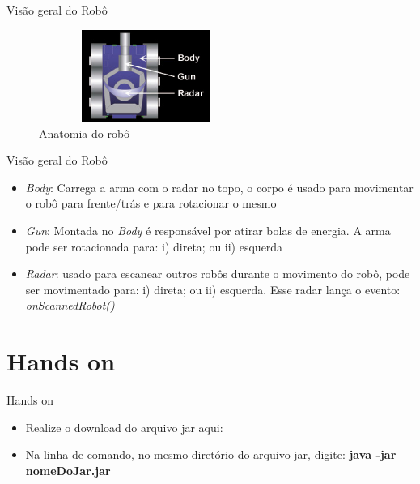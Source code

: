 \begin{frame}
	\begin{block}{Visão geral do Robô}
		\begin{figure}[!htb]
			\centering	  				
			\includegraphics[height=3cm, width = 7cm]{./pic/Anatomy.jpg}
			\caption{Anatomia do robô  \citep{ROBOWIKI}}
			\label{fig_instalacao04}
		\end{figure}
	\end{block}
\end{frame}


\begin{frame}
	\begin{block}{Visão geral do Robô}
		\begin{itemize}
			\item \emph{Body}: Carrega a arma com o radar no topo, o corpo é usado para movimentar o robô para frente/trás e para rotacionar o mesmo
			
			\item \emph{Gun}: Montada no \emph{Body} é responsável por atirar bolas de energia. A arma pode ser rotacionada para: i) direta; ou ii) esquerda

			\item \emph{Radar}: usado para escanear outros robôs durante o movimento do robô, pode ser movimentado para: i) direta; ou ii) esquerda. Esse radar lança o evento:  \emph{onScannedRobot()}  \citep{ROBOWIKI}
						
		\end{itemize}
	\end{block}
\end{frame}


\section{Hands on}

\begin{frame}
	\begin{block}{Hands on}
		\begin{itemize}
			\item Realize o download do arquivo jar aqui: \href{https://sourceforge.net/projects/robocode/files/robocode/1.9.3.4/}{\color{blue}{Source Forge}}  
			
			\item Na linha de comando, no  mesmo diretório do arquivo jar, digite: \textbf{java -jar nomeDoJar.jar}
		\end{itemize}
	\end{block}
\end{frame}

